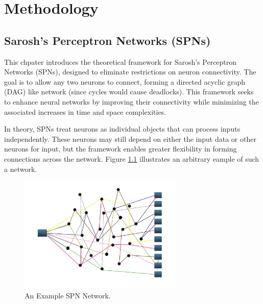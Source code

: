 
\chapter{Methodology} %

\label{Methodology} %


\section{Sarosh's Perceptron Networks (SPNs)}

This chpater introduces the theoretical framework for Sarosh's Perceptron Networks (SPNs), designed to eliminate restrictions on neuron connectivity. The goal is to allow any two neurons to connect, forming a directed acyclic graph (DAG) like network (since cycles would cause deadlocks). This framework seeks to enhance neural networks by improving their connectivity while minimizing the associated increases in time and space complexities.
 
In theory, SPNs treat neurons as individual objects that can process inputs independently. These neurons may still depend on either the input data or other neurons for input, but the framework enables greater flexibility in forming connections across the network. Figure \ref{fig:exampleSPN} illustrates an arbitrary eample of such a network.

\begin{figure}[h!]
\centering
\includegraphics[width=0.7\textwidth]{Figures/Methodology/example_spn.jpg}
\caption{An Example SPN Network.}
\label{fig:exampleSPN}
\end{figure}


